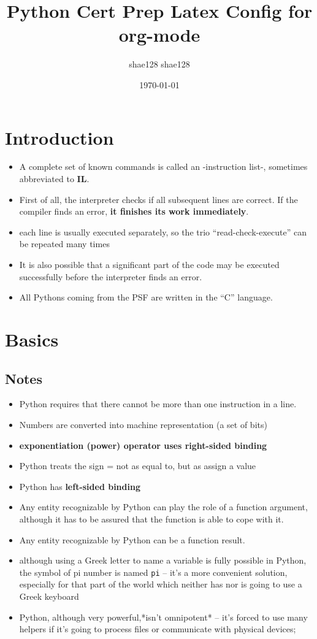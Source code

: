\documentclass[11pt]{article}
\author{shae128 shae128}
\date{\today}
\title{Python Cert Prep Latex Config for org-mode}
\begin{document}
\maketitle
\tableofcontents

\newpage

\section{Introduction}
\label{sec:orga1deaab}
\begin{itemize}
\item A complete set of known commands is called an -instruction list-,
sometimes abbreviated to \textbf{IL}.
\item First of all, the interpreter checks if all subsequent lines are
correct. If the compiler finds an error, \textbf{it finishes its work
immediately}.
\item each line is usually executed separately, so the trio
“read-check-execute” can be repeated many times
\item It is also possible that a significant part of the code may be
executed successfully before the interpreter finds an error.
\item All Pythons coming from the PSF are written in the “C” language.
\end{itemize}

\newpage
\section{Basics}
\label{sec:org4c97825}
\subsection{Notes}
\label{sec:orgafaa247}

\begin{itemize}
\item Python requires that there cannot be more than one instruction in a line.
\item Numbers are converted into machine representation (a set of bits)
\item \textbf{exponentiation (power) operator uses right-sided binding}
\item Python treats the sign = not as equal to, but as assign a value
\item Python has \textbf{left-sided binding}
\item Any entity recognizable by Python can play the
role of a function argument, although it has to be assured that the
function is able to cope with it.
\item Any entity recognizable by Python can be a function result.
\item although using a Greek letter to name a variable is fully possible
in Python, the symbol of pi number is named \texttt{pi} – it’s a more
convenient solution, especially for that part of the world which
neither has nor is going to use a Greek keyboard
\item Python, although very powerful,*isn’t omnipotent* – it’s forced to
use many helpers if it’s going to process files or communicate with
physical devices;
\end{itemize}
\end{document}

